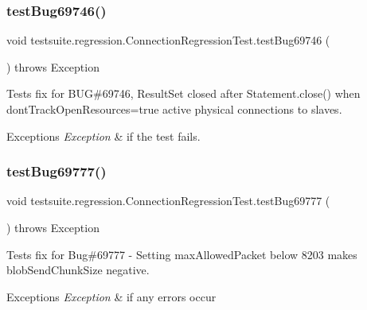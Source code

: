 \subsubsection{\texorpdfstring{test\+Bug69746()}{testBug69746()}}
{\footnotesize\ttfamily void testsuite.\+regression.\+Connection\+Regression\+Test.\+test\+Bug69746 (\begin{DoxyParamCaption}{ }\end{DoxyParamCaption}) throws Exception}

Tests fix for B\+UG\#69746, Result\+Set closed after Statement.\+close() when dont\+Track\+Open\+Resources=true active physical connections to slaves.


\begin{DoxyExceptions}{Exceptions}
{\em Exception} & if the test fails. \\
\hline
\end{DoxyExceptions}
\mbox{\label{classtestsuite_1_1regression_1_1_connection_regression_test_a6d62956aba90350317ed7d34d3d6eb39}} 
\subsubsection{\texorpdfstring{test\+Bug69777()}{testBug69777()}}
{\footnotesize\ttfamily void testsuite.\+regression.\+Connection\+Regression\+Test.\+test\+Bug69777 (\begin{DoxyParamCaption}{ }\end{DoxyParamCaption}) throws Exception}

Tests fix for Bug\#69777 -\/ Setting max\+Allowed\+Packet below 8203 makes blob\+Send\+Chunk\+Size negative.


\begin{DoxyExceptions}{Exceptions}
{\em Exception} & if any errors occur \\
\hline
\end{DoxyExceptions}
\mbox{\label{classtestsuite_1_1regression_1_1_connection_regression_test_a2e9ffad8504db4b26677d74c5f5b0a65}} 

